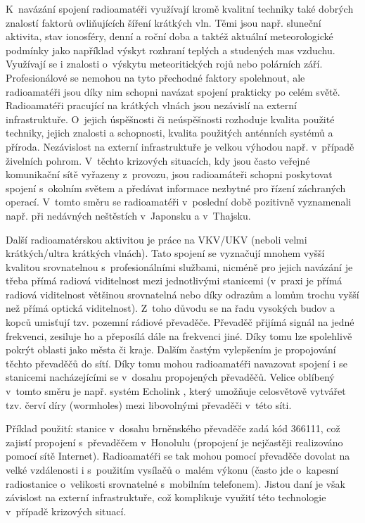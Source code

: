 K~navázání spojení radioamatéři využívají kromě
kvalitní techniky také dobrých znalostí faktorů
ovliňujících šíření krátkých vln. Těmi jsou např. sluneční aktivita,
stav ionosféry, denní a roční doba a taktéž aktuální meteorologické podmínky
jako například výskyt
rozhraní teplých a studených mas vzduchu. Využívají se i znalosti o~výskytu
meteoritických rojů nebo polárních září. Profesionálové se nemohou na tyto přechodné faktory spolehnout, ale 
radioamatéři jsou díky nim schopni navázat spojení prakticky po celém světě.
Radioamatéři pracující na krátkých vlnách jsou nezávislí na externí
infrastruktuře. O~jejich úspěšnosti či neúspěšnosti rozhoduje kvalita použité techniky,
jejich znalosti a schopnosti, kvalita použitých anténních systémů a příroda. Nezávislost na externí infrastruktuře je velkou výhodou např.
v~případě živelních pohrom. V~těchto krizových situacích, kdy jsou často veřejné
komunikační sítě vyřazeny z~provozu, jsou radioamáteři schopni poskytovat
spojení s~okolním světem a předávat informace nezbytné pro řízení záchraných
operací. V~tomto směru se radioamatéři v~poslední době pozitivně vyznamenali
např. při nedávných neštěstích v~Japonsku a v~Thajsku. 

Další radioamatérskou aktivitou je práce na VKV/UKV (neboli velmi krátkých/ultra
krátkých vlnách). Tato spojení se vyznačují mnohem vyšší kvalitou srovnatelnou
s~profesionálními službami, nicméně pro jejich navázání je třeba přímá radiová
viditelnost mezi jednotlivými stanicemi (v~praxi je přímá radiová viditelnost
většinou srovnatelná nebo díky odrazům a lomům trochu vyšší než přímá optická
viditelnost).
Z~toho důvodu se na řadu vysokých budov a kopců umisťují tzv. pozemní rádiové
převaděče. Převaděč přijímá signál na jedné frekvenci, zesiluje ho a přeposílá
dále na frekvenci jiné. Díky tomu lze spolehlivě pokrýt oblasti jako města či kraje.
Dalším častým vylepšením je propojování těchto převaděčů do sítí. Díky tomu mohou
radioamatéři navazovat spojení i se stanicemi nacházejícími se v~dosahu
propojených převaděčů. Velice oblíbený v~tomto směru je např. systém
Echolink \cite{echolink}, %
který umožňuje celosvětově vytvářet tzv. červí díry (wormholes) mezi libovolnými
převaděči v~této síti.

Příklad použití: stanice v~dosahu brněnského převaděče
zadá kód 366111, což zajistí propojení s~převaděčem v~Honolulu (propojení je
nejčastěji realizováno pomocí sítě Internet). Radioamatéři se tak mohou pomocí převaděče dovolat na velké vzdálenosti i s~použitím vysílačů o~malém výkonu
(často jde o~kapesní radiostanice o~velikosti srovnatelné s~mobilním telefonem).
Jistou daní je však závislost na externí infrastruktuře, což komplikuje využití
této technologie v~případě krizových situací.

